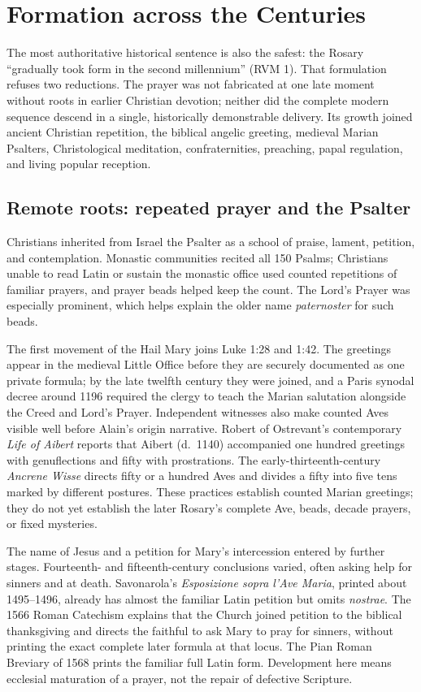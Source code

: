 \section{Formation across the Centuries}

The most authoritative historical sentence is also the safest: the Rosary ``gradually took form in the second millennium'' (RVM 1). That formulation refuses two reductions. The prayer was not fabricated at one late moment without roots in earlier Christian devotion; neither did the complete modern sequence descend in a single, historically demonstrable delivery. Its growth joined ancient Christian repetition, the biblical angelic greeting, medieval Marian Psalters, Christological meditation, confraternities, preaching, papal regulation, and living popular reception.

\subsection{Remote roots: repeated prayer and the Psalter}

Christians inherited from Israel the Psalter as a school of praise, lament, petition, and contemplation. Monastic communities recited all 150 Psalms; Christians unable to read Latin or sustain the monastic office used counted repetitions of familiar prayers, and prayer beads helped keep the count. The Lord's Prayer was especially prominent, which helps explain the older name \emph{paternoster} for such beads.

The first movement of the Hail Mary joins Luke 1:28 and 1:42. The greetings appear in the medieval Little Office before they are securely documented as one private formula; by the late twelfth century they were joined, and a Paris synodal decree around 1196 required the clergy to teach the Marian salutation alongside the Creed and Lord's Prayer. Independent witnesses also make counted Aves visible well before Alain's origin narrative. Robert of Ostrevant's contemporary \emph{Life of Aibert} reports that Aibert (d.~1140) accompanied one hundred greetings with genuflections and fifty with prostrations. The early-thirteenth-century \emph{Ancrene Wisse} directs fifty or a hundred Aves and divides a fifty into five tens marked by different postures. These practices establish counted Marian greetings; they do not yet establish the later Rosary's complete Ave, beads, decade prayers, or fixed mysteries.

The name of Jesus and a petition for Mary's intercession entered by further stages. Fourteenth- and fifteenth-century conclusions varied, often asking help for sinners and at death. Savonarola's \emph{Esposizione sopra l'Ave Maria}, printed about 1495--1496, already has almost the familiar Latin petition but omits \emph{nostrae}. The 1566 Roman Catechism explains that the Church joined petition to the biblical thanksgiving and directs the faithful to ask Mary to pray for sinners, without printing the exact complete later formula at that locus. The Pian Roman Breviary of 1568 prints the familiar full Latin form. Development here means ecclesial maturation of a prayer, not the repair of defective Scripture.

